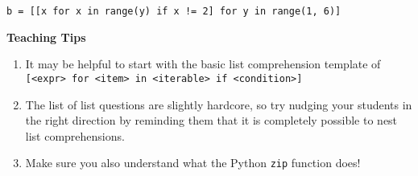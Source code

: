 \begin{blocksection}
\begin{parts}
\begin{solution}[0.25in]
\begin{lstlisting}
b = [[x for x in range(y) if x != 2] for y in range(1, 6)]
\end{lstlisting}
\end{solution}
\end{parts}
\begin{blocksection}
    \begin{guide}
    \textbf{Teaching Tips}
    \begin{enumerate}
            \item It may be helpful to start with the basic list comprehension template of \texttt{[<expr> for <item> in <iterable> if <condition>]}
            \item The list of list questions are slightly hardcore, so try nudging your students in the right direction by reminding them that it is completely possible to nest list comprehensions.
            \item Make sure you also understand what the Python \texttt{zip} function does!
    \end{enumerate}
    \end{guide}
\end{blocksection}
\end{blocksection}
